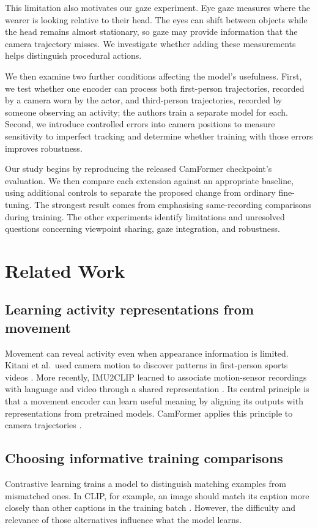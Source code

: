 \documentclass[10pt,twocolumn,letterpaper]{article}
\begin{document}
This limitation also motivates our gaze experiment. Eye gaze measures where the wearer is looking relative to their
head. The eyes can shift between objects while the head remains almost stationary, so gaze may provide information
that the camera trajectory misses. We investigate whether adding these measurements helps distinguish procedural
actions.

We then examine two further conditions affecting the model's usefulness. First, we test whether one encoder can
process both first-person trajectories, recorded by a camera worn by the actor, and third-person trajectories,
recorded by someone observing an activity; the authors train a separate model for each. Second, we introduce
controlled errors into camera positions to measure sensitivity to imperfect tracking and determine whether training
with those errors improves robustness.

Our study begins by reproducing the released CamFormer checkpoint's evaluation. We then compare each extension
against an appropriate baseline, using additional controls to separate the proposed change from ordinary
fine-tuning. The strongest result comes from emphasising same-recording comparisons during training. The other
experiments identify limitations and unresolved questions concerning viewpoint sharing, gaze integration, and
robustness.

\section{Related Work}
\label{sec:related}

\subsection{Learning activity representations from movement}
Movement can reveal activity even when appearance information is limited. Kitani et al.\ used camera motion to
discover patterns in first-person sports videos \cite{kitani2011fast}. More recently, IMU2CLIP learned to associate
motion-sensor recordings with language and video through a shared representation \cite{moon2023imu2clip}. Its
central principle is that a movement encoder can learn useful meaning by aligning its outputs with representations
from pretrained models. CamFormer applies this principle to camera trajectories \cite{xue2026seeing}.

\subsection{Choosing informative training comparisons}
Contrastive learning trains a model to distinguish matching examples from mismatched ones. In CLIP, for example, an
image should match its caption more closely than other captions in the training batch \cite{radford2021clip}.
However, the difficulty and relevance of those alternatives influence what the model learns.
\end{document}
